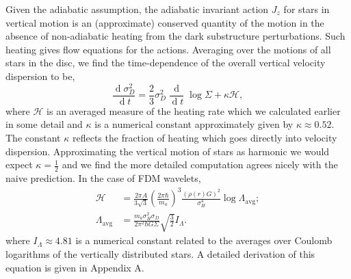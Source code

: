 \documentclass[usenatbib]{mnras}
\renewcommand{\d}[1]{\! \mathrm{d}#1 \:}
\newcommand{\deriv}[2]{\frac{\d{#1}}{\d{#2}}}
\renewcommand{\d}[1]{\ensuremath{\operatorname{d}\!{#1}}}
\begin{document}
\par
Given the adiabatic assumption, the adiabatic invariant action $J_z$ for stars in vertical motion is an (approximate) conserved quantity of the motion in the absence of non-adiabatic heating from the dark substructure perturbations. Such heating gives flow equations for the actions. Averaging over the motions of all stars in the disc, we find the time-dependence of the overall vertical velocity dispersion to be,
\begin{equation} \label{adiabatic_heating_rate}
\deriv{\sigma_D^2}{t} = \frac{2}{3} \sigma_D^2 \deriv{}{t} \log{\Sigma} + \kappa \mathcal{H}, 
\end{equation} 
where $\mathcal{H}$ is an averaged measure of the heating rate which we calculated earlier in some detail and $\kappa$ is a numerical constant approximately given by $\kappa \approx 0.52$. The constant $\kappa$ reflects the fraction of heating which goes directly into velocity dispersion. Approximating the vertical motion of stars as harmonic we would expect $\kappa = \frac{1}{2}$ and we find the more detailed computation agrees nicely with the naive prediction. In the case of FDM wavelets,
\begin{subequations}
\begin{align*}
\mathcal{H} & = \frac{2 \pi A}{3 \sqrt{3}} \left( \frac{2 \pi \hbar}{m_a} \right)^3 \frac{(\rho(r) G)^2}{\sigma_H^4} \log{\Lambda_{\text{avg}}};
\\
\Lambda_{\text{avg}} & = \frac{m_a \sigma_H^2 \sigma_D}{2 \pi^2 \hbar G \Sigma} \sqrt{\tfrac{3}{2}} I_\Lambda.
\end{align*}
\end{subequations}
where $I_{\Lambda} \approx 4.81$ is a numerical constant related to the averages over Coulomb logarithms of the vertically distributed stars. A detailed derivation of this equation is given in Appendix A. 
\end{document}

